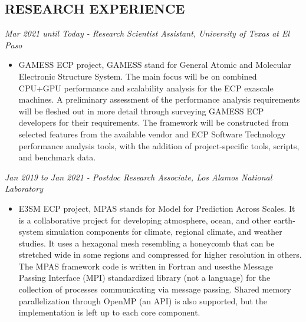 \documentclass[margin]{res}
\begin{document}
\begin{resume}
\section{RESEARCH EXPERIENCE}
{\sl Mar 2021 until Today - Research Scientist Assistant, University of Texas at El Paso} %
\begin{itemize}\itemsep -2pt
\item GAMESS ECP project, GAMESS stand for General Atomic and Molecular Electronic Structure System. 
The main focus will be on combined CPU+GPU performance and scalability analysis for the ECP exascale machines. A preliminary assessment of the performance analysis requirements will be fleshed out in more detail through surveying GAMESS ECP developers for their requirements. The framework will be constructed from selected features from the available vendor and ECP Software Technology performance analysis tools, with the addition of project-specific tools, scripts, and benchmark data.
\end{itemize}

{\sl Jan 2019 to Jan 2021 - Postdoc Research Associate, Los Alamos National Laboratory} %
\begin{itemize}\itemsep -2pt
\item E3SM ECP project, MPAS stands for Model for Prediction Across Scales. It is a collaborative project for developing atmosphere, ocean,  and other earth-system simulation components for climate, regional climate, and weather studies. It uses a hexagonal mesh resembling a honeycomb that can be stretched wide in some regions and compressed for higher resolution in others.
The MPAS framework code is written in Fortran and usesthe  Message Passing Interface (MPI)  standardized library (not a language) for the collection of processes communicating via message passing. Shared memory parallelization through OpenMP (an API) is also supported, but the implementation is left up to each core component.  
\end{itemize}


\end{resume}
\end{document}
